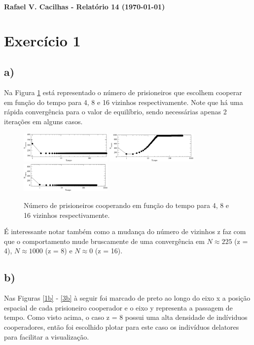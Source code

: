 \documentclass[a4wide]{report}
\begin{document}
\noindent
{\bf Rafael V. Cacilhas  - Relatório 14 (\today)}

\vspace{0.5cm}

\section*{Exercício 1}

\subsection*{a) }
Na Figura \ref{1a} está representado o número de prisioneiros que escolhem cooperar em função do tempo para 4, 8 e 16 vizinhos respectivamente. Note que há uma rápida convergência para o valor de equilíbrio, sendo necessárias apenas 2 iterações em alguns casos. 
\begin{figure}[!htb]
\centering
\includegraphics[width=0.4\textwidth]{az4.pdf} \newline
\includegraphics[width=0.4\textwidth]{az8.pdf} \newline
\includegraphics[width=0.4\textwidth]{az16.pdf}\newline
\caption{Número de prisioneiros cooperando em função do tempo para 4, 8 e 16 vizinhos respectivamente.}
\label{1a}
\end{figure}

É interessante notar também como a mudança do número de vizinhos z faz com que o comportamento mude bruscamente de uma convergência em $N \approx 225$ (z = 4), $N \approx 1000$ (z = 8) e $N \approx 0$ (z = 16).


\subsection*{b) }
Nas Figuras \ref{1b} - \ref{3b} à seguir foi marcado de preto ao longo do eixo x a posição espacial de cada prisioneiro cooperador e o eixo y representa a passagem de tempo. Como visto acima, o caso z = 8 possui uma alta densidade de indíviduos cooperadores, então foi escolhido plotar para este caso os indivíduos delatores para facilitar a visualização. 
\end{document}

